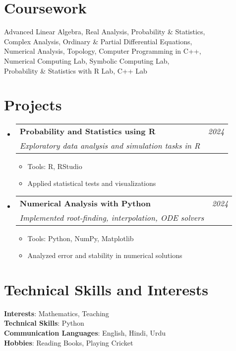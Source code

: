 \documentclass[a4paper,11pt]{article}
\makeatletter
\newcommand{\resumeProject}[4]{
\vspace{0.5mm}\item
    \begin{tabular*}{0.98\textwidth}[t]{l@{\extracolsep{\fill}}r}
        \textbf{#1} & \textit{\footnotesize{#3}} \\
        \footnotesize{\textit{#2}} & \footnotesize{#4}
    \end{tabular*}
    \vspace{-2.4mm}
}
\newcommand{\resumeSubHeadingListStart}{\begin{itemize}[leftmargin=*,labelsep=0mm]}
\newcommand{\resumeItemListStart}{\begin{justify}\begin{itemize}[leftmargin=3ex, rightmargin=2ex, noitemsep,labelsep=1.2mm,itemsep=0mm]\small}
\newcommand{\resumeSubHeadingListEnd}{\end{itemize}\vspace{2mm}}
\newcommand{\resumeItemListEnd}{\end{itemize}\end{justify}\vspace{-2mm}}
\makeatother
\begin{document}
\section{\textbf{Coursework}}
\begin{itemize}[leftmargin=0.05in, label={}]
  \small{\item{
   Advanced Linear Algebra, Real Analysis, Probability \& Statistics, \\
   Complex Analysis, Ordinary \& Partial Differential Equations, \\
   Numerical Analysis, Topology, Computer Programming in C++, \\
   Numerical Computing Lab, Symbolic Computing Lab, \\
   Probability \& Statistics with R Lab, C++ Lab
  }}
\end{itemize}

\section{\textbf{Projects}}
\resumeSubHeadingListStart
  \resumeProject
    {Probability and Statistics using R}{Exploratory data analysis and simulation tasks in R}{2024}{}
    \resumeItemListStart
      \item Tools: R, RStudio
      \item Applied statistical tests and visualizations
    \resumeItemListEnd

  \resumeProject
    {Numerical Analysis with Python}{Implemented root-finding, interpolation, ODE solvers}{2024}{}
    \resumeItemListStart
      \item Tools: Python, NumPy, Matplotlib
      \item Analyzed error and stability in numerical solutions
    \resumeItemListEnd
\resumeSubHeadingListEnd

\section{\textbf{Technical Skills and Interests}}
\begin{itemize}[leftmargin=0.05in, label={}]
  \small{\item{
  \textbf{Interests}{: Mathematics, Teaching} \\
   \textbf{Technical Skills}{: Python} \\
   \textbf{Communication Languages}{: English, Hindi, Urdu} \\
   \textbf{Hobbies}{: Reading Books, Playing Cricket} \\
  }}
\end{itemize}
\end{document}
